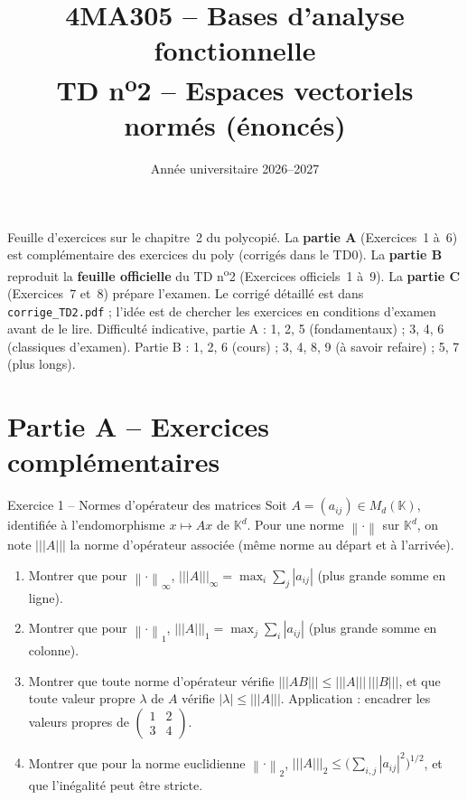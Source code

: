 \documentclass[11pt,a4paper]{article}
\title{\textbf{4MA305 -- Bases d'analyse fonctionnelle}\\[2mm]
\Large TD n\textsuperscript{o}2 -- Espaces vectoriels normés (énoncés)}
\author{}
\date{Année universitaire 2026--2027}
\newcommand{\K}{\mathbb{K}}
\newcommand{\norm}[1]{\left\|#1\right\|}
\newcommand{\opnorm}[1]{|\!|\!|#1|\!|\!|}
\theoremstyle{definition}
\begin{document}
\maketitle

\begin{commentaire}
Feuille d'exercices sur le chapitre~2 du polycopié. La \textbf{partie A} (Exercices~1 à~6) est complémentaire des exercices du poly (corrigés dans le TD0). La \textbf{partie B} reproduit la \textbf{feuille officielle} du TD n\textsuperscript{o}2 (Exercices officiels~1 à~9). La \textbf{partie C} (Exercices~7 et~8) prépare l'examen. Le corrigé détaillé est dans \texttt{corrige\_TD2.pdf} ; l'idée est de chercher les exercices en conditions d'examen avant de le lire. Difficulté indicative, partie A : 1, 2, 5 (fondamentaux) ; 3, 4, 6 (classiques d'examen). Partie B : 1, 2, 6 (cours) ; 3, 4, 8, 9 (à savoir refaire) ; 5, 7 (plus longs).
\end{commentaire}

\section*{Partie A -- Exercices complémentaires}

\begin{exo}{Exercice 1 -- Normes d'opérateur des matrices}
Soit $A=(a_{ij})\in M_d(\K)$, identifiée à l'endomorphisme $x\mapsto Ax$ de $\K^d$. Pour une norme $\norm\cdot$ sur $\K^d$, on note $\opnorm A$ la norme d'opérateur associée (même norme au départ et à l'arrivée).
\begin{enumerate}[label=(\alph*)]
  \item Montrer que pour $\norm\cdot_\infty$, $\opnorm A_\infty=\max_i\sum_j|a_{ij}|$ (plus grande somme en ligne).
  \item Montrer que pour $\norm\cdot_1$, $\opnorm A_1=\max_j\sum_i|a_{ij}|$ (plus grande somme en colonne).
  \item Montrer que toute norme d'opérateur vérifie $\opnorm{AB}\le\opnorm A\,\opnorm B$, et que toute valeur propre $\lambda$ de $A$ vérifie $|\lambda|\le\opnorm A$. Application : encadrer les valeurs propres de $\begin{pmatrix}1&2\\3&4\end{pmatrix}$.
  \item Montrer que pour la norme euclidienne $\norm\cdot_2$, $\opnorm A_2\le\big(\sum_{i,j}|a_{ij}|^2\big)^{1/2}$, et que l'inégalité peut être stricte.
\end{enumerate}
\end{exo}
\end{document}
